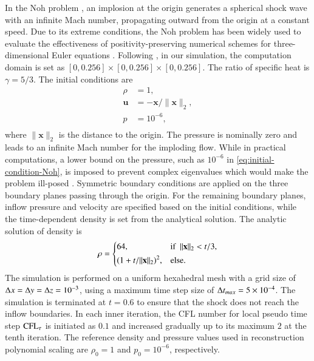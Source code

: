 In the Noh problem \cite{noh1987errors}, an implosion at the origin generates a spherical shock wave with an infinite Mach number, propagating outward from the origin at a constant speed. 
Due to its extreme conditions, the Noh problem has been widely used to evaluate the effectiveness of positivity-preserving numerical schemes for three-dimensional Euler equations \cite{hu2013positivity}.
Following \cite{johnsen2010assessment}, 
in our simulation, the computation domain is set as
$[0,0.256]\times[0,0.256]\times[0,0.256]$. The ratio of specific heat is $\gamma=5/3$.
The initial conditions are
\begin{equation}
\label{eq:initial-condition-Noh}
    \begin{aligned}
        \rho & = 1, \\
        \mathbf{u}  &= -\mathbf{x} /\|\mathbf{x}\|_2, \\
        p & = 10^{-6},\\
    \end{aligned}
\end{equation}
where $\|\mathbf{x}\|_2$ is the distance to the 
origin. The pressure is nominally zero and leads to an infinite Mach number for the imploding flow. While in practical computations, a lower bound on the pressure, such as $10^{-6}$ in \eqref{eq:initial-condition-Noh}, is imposed to prevent complex eigenvalues which would make the problem ill-posed \cite{johnsen2010assessment}.
Symmetric boundary conditions are applied on the three boundary planes passing through the origin. For the remaining boundary planes, inflow pressure and velocity are specified based on the initial conditions, while the time-dependent density is set from the analytical solution.
The analytic solution of density \cite{noh1987errors} is 
\begin{equation}
    \rho = 
    \begin{dcases}
        64, & \text{if } \ \|\mathbf{x}\|_2<t/3, \\
        (1+t/\|\mathbf{x}\|_2)^2,  & \text{else}.
    \end{dcases}
\end{equation}
The simulation is performed on a uniform hexahedral mesh with a grid size of $\mathrm\Delta x = \mathrm\Delta y= \mathrm\Delta z = 10^{-3}$, using a maximum time step size of $\mathrm\Delta t_{max}=5 \times 10^{-4}$. The simulation is terminated at $t=0.6$ to ensure that the 
shock does not reach the inflow boundaries. 
In each inner iteration, the CFL number for local pseudo time step $\text{CFL}_\tau$ is initiated as $0.1$
and increased gradually up to its maximum $2$ at the tenth iteration.
The reference density and pressure values used in reconstruction polynomial scaling are $\rho_0=1$ and $p_0=10^{-6}$, respectively. 

